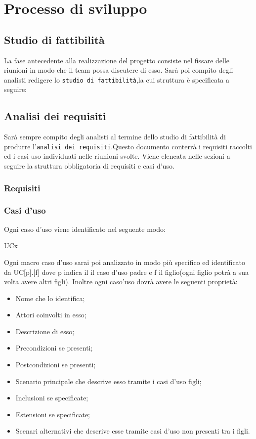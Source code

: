 \section{Processo di sviluppo}

	\subsection{Studio di fattibilità}
	La fase antecedente alla realizzazione del progetto consiste nel fissare delle riunioni in modo che il team possa discutere di esso. Sarà poi compito degli analisti redigere lo \texttt{studio di fattibilità},la cui struttura è specificata a seguire: %
	\subsection{Analisi dei requisiti}
	Sarà sempre compito degli analisti al termine dello studio di fattibilità di produrre l'\texttt{analisi dei requisiti}.Questo documento conterrà i requisiti raccolti ed i casi uso individuati nelle riunioni svolte.
	Viene elencata nelle sezioni a seguire la struttura obbligatoria di requisiti e casi d'uso.
		\subsubsection{Requisiti}
		\subsubsection{Casi d'uso}
		Ogni caso d'uso viene identificato nel seguente modo:
		\centerline{UCx}
		Ogni macro caso d'uso sarai poi analizzato in modo più specifico ed identificato da UC[p].[f] dove p indica il il caso d'uso padre e f il figlio(ogni figlio potrà a sua volta avere altri figli).
		Inoltre ogni caso'uso dovrà avere le seguenti proprietà:
		\begin{itemize}
		\item Nome che lo identifica;
		\item Attori coinvolti in esso;
		\item Descrizione di esso;
		\item Precondizioni se presenti;
		\item Postcondizioni se presenti;
		\item Scenario principale che descrive esso tramite i casi d'uso figli;
		\item Inclusioni se specificate;
		\item Estensioni se specificate;
		\item Scenari alternativi che descrive esse tramite casi d'uso non presenti tra i figli.
		\end{itemize}
